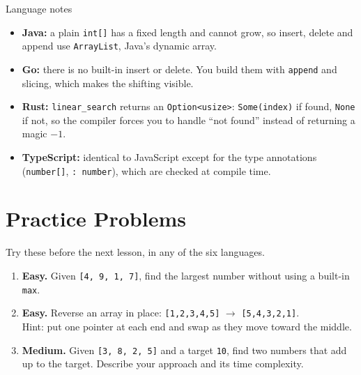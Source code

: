 \documentclass[11pt,a4paper]{article}
\begin{document}





\begin{callout}[warn]{Language notes}
\begin{itemize}
  \item \textbf{Java:} a plain \texttt{int[]} has a fixed length and cannot grow, so insert, delete and append use \texttt{ArrayList}, Java's dynamic array.
  \item \textbf{Go:} there is no built-in insert or delete. You build them with \texttt{append} and slicing, which makes the  shifting visible.
  \item \textbf{Rust:} \texttt{linear\_search} returns an \texttt{Option<usize>}: \texttt{Some(index)} if found, \texttt{None} if not, so the compiler forces you to handle ``not found'' instead of returning a magic $-1$.
  \item \textbf{TypeScript:} identical to JavaScript except for the type annotations (\texttt{number[]}, \texttt{: number}), which are checked at compile time.
\end{itemize}
\end{callout}

\section{Practice Problems}\label{s:practice}

Try these before the next lesson, in any of the six languages.

\begin{enumerate}[leftmargin=1.6em,itemsep=6pt]
  \item[\textbf{1.}] \textbf{Easy.} Given \texttt{[4, 9, 1, 7]}, find the largest number without using a built-in \texttt{max}.
  \item[\textbf{2.}] \textbf{Easy.} Reverse an array in place: \texttt{[1,2,3,4,5]} $\to$ \texttt{[5,4,3,2,1]}.\\
    {\small\color{cmt}Hint: put one pointer at each end and swap as they move toward the middle.}
  \item[\textbf{3.}] \textbf{Medium.} Given \texttt{[3, 8, 2, 5]} and a target \texttt{10}, find two numbers that add up to the target. Describe your approach and its time complexity.
\end{enumerate}
\end{document}
